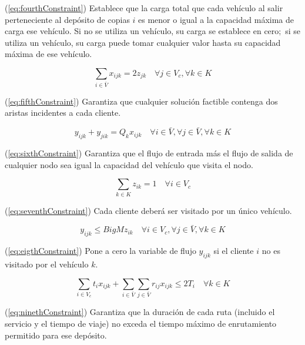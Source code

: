 \documentclass[letter, 10pt]{article}
\begin{document}
(\ref{eq:fourthConstraint}) Establece que la carga total que cada vehículo al salir perteneciente al depósito de copias $i$ es menor o igual a la capacidad máxima de carga ese vehículo. Si no se utiliza un vehículo, su carga se establece en cero$;$ si se utiliza un vehículo, su carga puede tomar cualquier valor hasta su capacidad máxima de ese vehículo.

\begin{equation}
    \label{eq:fifthConstraint}
    \sum_{i \in \bar{V}}{x_{ijk}} = 2z_{jk} \quad \forall j \in V_{c}, \forall k \in K
\end{equation}

(\ref{eq:fifthConstraint}) Garantiza que cualquier solución factible contenga dos aristas incidentes a cada cliente.

\begin{equation}
    \label{eq:sixthConstraint}
    y_{ijk} + y_{jik} = Q_{k}x_{ijk} \quad \forall i \in \bar{V}, \forall j \in \bar{V}, \forall k \in K
\end{equation}

(\ref{eq:sixthConstraint}) Garantiza que el flujo de entrada más el flujo de salida de cualquier nodo sea igual la capacidad del vehículo que visita el nodo.

\begin{equation}
    \label{eq:seventhConstraint}
    \sum_{k \in K}{z_{ik}} = 1 \quad \forall i \in V_{c}
\end{equation}

(\ref{eq:seventhConstraint}) Cada cliente deberá ser visitado por un único vehículo.

\begin{equation}
    \label{eq:eigthConstraint}
    y_{ijk} \leq BigMz_{ik} \quad \forall i \in V_{c}, \forall j \in \bar{V}, \forall k \in K
\end{equation}

(\ref{eq:eigthConstraint}) Pone a cero la variable de flujo  $y_{ijk}$ si el cliente $i$ no es visitado por el vehículo $k$.

\begin{equation}
    \label{eq:ninethConstraint}
    \sum_{i \in V_{c}}{t_{i}x_{ijk}} + \sum_{i \in \bar{V}} \sum_{j \in \bar{V}}{r_{ij}x_{ijk}} \leq 2T_{i} \quad \forall k \in K
\end{equation}

(\ref{eq:ninethConstraint}) Garantiza que la duración de cada ruta (incluido el servicio y el tiempo de viaje) no exceda el tiempo máximo de enrutamiento permitido para ese depósito.
\end{document}

